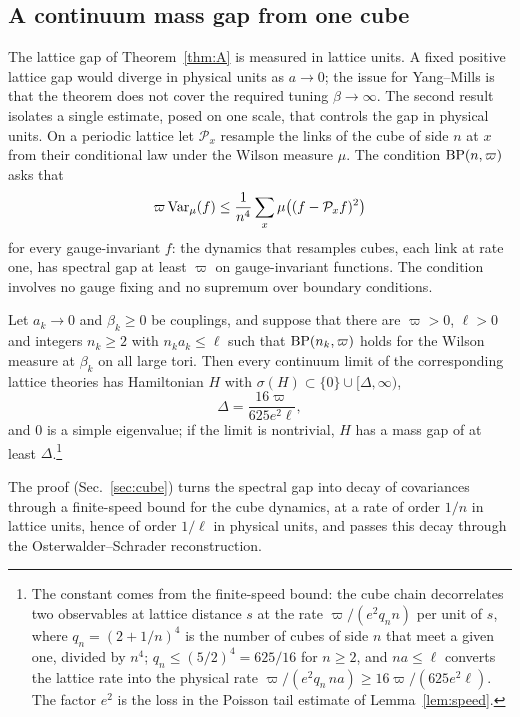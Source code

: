 \subsection{A continuum mass gap from one cube}

The lattice gap of Theorem~\ref{thm:A} is measured in lattice units. A fixed positive lattice gap would diverge in physical units as $a\to0$; the issue for Yang--Mills is that the theorem does not cover the required tuning $\beta\to\infty$. The second result isolates a single
estimate, posed on one scale, that controls the gap in physical units. On a
periodic lattice let $\mathcal P_x$ resample the links of the cube of side $n$
at $x$ from their conditional law under the Wilson measure $\mu$. The
condition $\mathrm{BP}(n,\varpi)$ asks that
\[
\varpi\operatorname{Var}_\mu(f)\le\frac1{n^4}\sum_x\mu\bigl((f-\mathcal P_xf)^2\bigr)
\]
for every gauge-invariant $f$: the dynamics that resamples cubes, each link
at rate one, has spectral gap at least $\varpi$ on gauge-invariant functions.
The condition involves no gauge fixing and no supremum over boundary
conditions.

\begin{mainthm}\label{thm:B}
Let $a_k\to0$ and $\beta_k\ge0$ be couplings, and suppose that there are
$\varpi>0$, $\ell>0$ and integers $n_k\ge2$ with $n_ka_k\le\ell$ such that
$\mathrm{BP}(n_k,\varpi)$ holds for the Wilson measure at $\beta_k$ on all large tori.
Then every continuum limit of the corresponding lattice theories has
Hamiltonian $H$ with $\sigma(H)\subset\{0\}\cup[\Delta,\infty)$,
\[
\Delta=\frac{16\varpi}{625e^2\ell},
\]
and $0$ is a simple eigenvalue; if the limit is nontrivial, $H$ has a mass
gap of at least $\Delta$.\footnote{The constant comes from the finite-speed
bound: the cube chain decorrelates two observables at lattice distance $s$
at the rate $\varpi/(e^2q_nn)$ per unit of $s$, where $q_n=(2+1/n)^4$ is the
number of cubes of side $n$ that meet a given one, divided by $n^4$;
$q_n\le(5/2)^4=625/16$ for $n\ge2$, and $na\le\ell$ converts the lattice rate
into the physical rate $\varpi/(e^2q_n\,na)\ge16\varpi/(625e^2\ell)$. The
factor $e^2$ is the loss in the Poisson tail estimate of Lemma~\ref{lem:speed}.}
\end{mainthm}

The proof (Sec.~\ref{sec:cube}) turns the spectral gap into decay of
covariances through a finite-speed bound for the cube dynamics, at a rate
of order $1/n$ in lattice units, hence of order $1/\ell$ in physical units,
and passes this decay through the Osterwalder--Schrader reconstruction.

